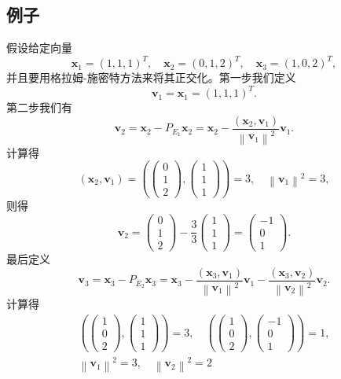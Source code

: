 \subsection{例子}

假设给定向量\[\mathbf{x}_1=(1,1,1)^T,\quad\mathbf{x}_2=(0,1,2)^T,\quad\mathbf{x}_3=(1,0,2)^T,\]
并且要用格拉姆-施密特方法来将其正交化。第一步我们定义
$$\mathbf{v}_{1}=\mathbf{x}_{1}=(1,1,1)^{T}.$$
第二步我们有
$$
\mathbf{v}_{2}=\mathbf{x}_{2}-P_{E_{1}}\mathbf{x}_{2}=\mathbf{x}_{2}-\frac{\left(\mathbf{x}_{2}, \mathbf{v}_{1}\right)}{\left\|\mathbf{v}_{1}\right\|^{2}} \mathbf{v}_{1}.$$
计算得
$$\left(\mathbf{x}_{2}, \mathbf{v}_{1}\right)=\left(\left(\begin{array}{l}
0 \\
1 \\
2
\end{array}\right),\left(\begin{array}{l}
1 \\
1 \\
1
\end{array}\right)\right)=3, \quad\left\|\mathbf{v}_{1}\right\|^{2}=3,$$
则得
$$\mathbf{v}_{2}=\left(\begin{array}{l}
0 \\
1 \\
2
\end{array}\right)-\frac{3}{3}\left(\begin{array}{l}
1 \\
1 \\
1
\end{array}\right)=\left(\begin{array}{r}
-1 \\
0 \\
1
\end{array}\right).$$
最后定义
$$\mathbf{v}_{3}=\mathbf{x}_{3}-P_{E_{2}}\mathbf{x}_{3}=\mathbf{x}_{3}-\frac{\left(\mathbf{x}_{3}, \mathbf{v}_{1}\right)}{\left\|\mathbf{v}_{1}\right\|^{2}} \mathbf{v}_{1}-\frac{\left(\mathbf{x}_{3}, \mathbf{v}_{2}\right)}{\left\|\mathbf{v}_{2}\right\|^{2}} \mathbf{v}_{2}.$$
计算得
\begin{gather*}
    \left(\left(\begin{array}{l}
1 \\
0 \\
2
\end{array}\right),\left(\begin{array}{l}
1 \\
1 \\
1
\end{array}\right)\right)=3, \quad \left(\left(\begin{array}{l}
1 \\
0 \\
2
\end{array}\right),\left(\begin{array}{r}
-1 \\
0 \\
1
\end{array}\right)\right)=1, \\
\left\|\mathbf{v}_{1}\right\|^{2}=3,\quad  \left\|\mathbf{v}_{2}\right\|^{2}=2
\end{gather*}
